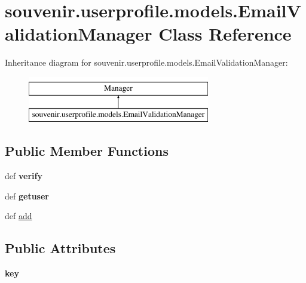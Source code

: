 \hypertarget{classsouvenir_1_1userprofile_1_1models_1_1EmailValidationManager}{\section{souvenir.\-userprofile.\-models.\-Email\-Validation\-Manager Class Reference}
\label{classsouvenir_1_1userprofile_1_1models_1_1EmailValidationManager}
}
Inheritance diagram for souvenir.\-userprofile.\-models.\-Email\-Validation\-Manager\-:\begin{figure}[H]
\begin{center}
\leavevmode
\includegraphics[height=2.000000cm]{classsouvenir_1_1userprofile_1_1models_1_1EmailValidationManager}
\end{center}
\end{figure}
\subsection*{Public Member Functions}
\begin{DoxyCompactItemize}
\item 
\hypertarget{classsouvenir_1_1userprofile_1_1models_1_1EmailValidationManager_a1b0afc19d7a8d42a23fc9d51d6669e36}{def {\bfseries verify}}\label{classsouvenir_1_1userprofile_1_1models_1_1EmailValidationManager_a1b0afc19d7a8d42a23fc9d51d6669e36}

\item 
\hypertarget{classsouvenir_1_1userprofile_1_1models_1_1EmailValidationManager_ab2cf3c6fd85aaa4c8d6487ad3f05d471}{def {\bfseries getuser}}\label{classsouvenir_1_1userprofile_1_1models_1_1EmailValidationManager_ab2cf3c6fd85aaa4c8d6487ad3f05d471}

\item 
def \hyperlink{classsouvenir_1_1userprofile_1_1models_1_1EmailValidationManager_a204add9b7838828c02c1030891eebb82}{add}
\end{DoxyCompactItemize}
\subsection*{Public Attributes}
\begin{DoxyCompactItemize}
\item 
\hypertarget{classsouvenir_1_1userprofile_1_1models_1_1EmailValidationManager_ae19b47430f6c6f6b0be5f23aa0f1bb33}{{\bfseries key}}\label{classsouvenir_1_1userprofile_1_1models_1_1EmailValidationManager_ae19b47430f6c6f6b0be5f23aa0f1bb33}

\end{DoxyCompactItemize}


